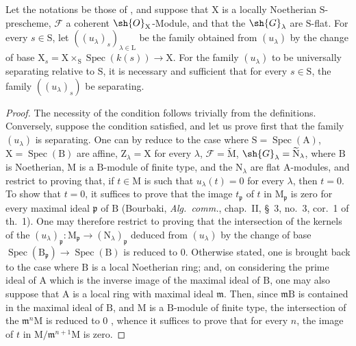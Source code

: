 \begin{theorem}[11.9.16]
\label{IV.11.9.16}
Let the notations be those of , and suppose that $\mathrm{X}$ is a locally Noetherian $\mathrm{S}$-prescheme, $\mathscr{F}$ a coherent $\sh{O}_\mathrm{X}$-Module, and that the $\sh{G}_\lambda$ are $\mathrm{S}$-flat.
For every $s\in\mathrm{S}$, let $((u_\lambda)_s)_{\lambda\in\mathrm{L}}$ be the family obtained from $(u_\lambda)$ by the change of base $\mathrm{X}_s=\mathrm{X}\times_\mathrm{S}\operatorname{Spec}(k(s))\to\mathrm{X}$.
For the family $(u_\lambda)$ to be universally separating relative to $\mathrm{S}$, it is necessary and sufficient that for every $s\in\mathrm{S}$, the family $((u_\lambda)_s)$ be separating.
\end{theorem}

\begin{proof}
The necessity of the condition follows trivially from the definitions.
Conversely, suppose the condition satisfied, and let us prove first that the family $(u_\lambda)$ is separating.
One can by  reduce to the case where $\mathrm{S}=\operatorname{Spec}(\mathrm{A})$, $\mathrm{X}=\operatorname{Spec}(\mathrm{B})$ are affine, $\mathrm{Z}_\lambda=\mathrm{X}$ for every $\lambda$, $\mathscr{F}=\widetilde{\mathrm{M}}$, $\sh{G}_\lambda=\widetilde{\mathrm{N}}_\lambda$, where $\mathrm{B}$ is Noetherian, $\mathrm{M}$ is a $\mathrm{B}$-module of finite type, and the $\mathrm{N}_\lambda$ are flat $\mathrm{A}$-modules, and restrict to proving that, if $t\in\mathrm{M}$ is such that $u_\lambda(t)=0$ for every $\lambda$, then $t=0$.
To show that $t=0$, it suffices to prove that the image $t_\mathfrak{p}$ of $t$ in $\mathrm{M}_\mathfrak{p}$ is zero for every maximal ideal $\mathfrak{p}$ of $\mathrm{B}$ (Bourbaki, \emph{Alg.\ comm.}, chap.~II, \S~3, no.~3, cor.~1 of th.~1).
One may therefore restrict to proving that the intersection
of the kernels of the $(u_\lambda)_\mathfrak{p}:\mathrm{M}_\mathfrak{p}\to(\mathrm{N}_\lambda)_\mathfrak{p}$ deduced from $(u_\lambda)$ by the change of base $\operatorname{Spec}(\mathrm{B}_\mathfrak{p})\to\operatorname{Spec}(\mathrm{B})$ is reduced to $0$.
Otherwise stated, one is brought back to the case where $\mathrm{B}$ is a local Noetherian ring; and, on considering the prime ideal of $\mathrm{A}$ which is the inverse image of the maximal ideal of $\mathrm{B}$, one may also suppose that $\mathrm{A}$ is a local ring with maximal ideal $\mathfrak{m}$.
Then, since $\mathfrak{m}\mathrm{B}$ is contained in the maximal ideal of $\mathrm{B}$, and $\mathrm{M}$ is a $\mathrm{B}$-module of finite type, the intersection of the $\mathfrak{m}^{n}\mathrm{M}$ is reduced to $0$ , whence it suffices to prove that for every $n$, the image of $t$ in $\mathrm{M}/\mathfrak{m}^{n+1}\mathrm{M}$ is zero.

\end{proof}
